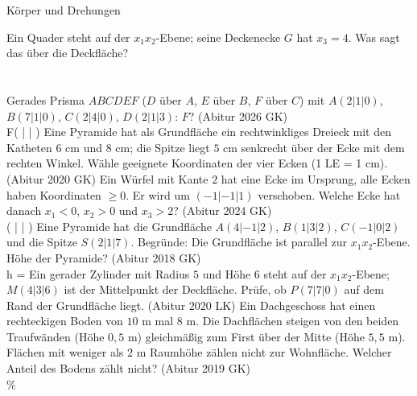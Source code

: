 \setcounter{aufgabe}{18}

\begin{aufgabe}{Körper und Drehungen}
\begin{teile}
\teil Ein Quader steht auf der $x_1x_2$-Ebene; seine Deckenecke $G$ hat $x_3 = 4$. Was sagt das über die Deckfläche? \\  \\  \\ 
\teil Gerades Prisma $ABCDEF$ ($D$ über $A$, $E$ über $B$, $F$ über $C$) mit $A(2 | 1 | 0)$, $B(7 | 1 | 0)$, $C(2 | 4 | 0)$, $D(2 | 1 | 3)$: $F$? \hfill (Abitur 2026 GK) \\ F( \leerfeld | \leerfeld | \leerfeld )
\teil Eine Pyramide hat als Grundfläche ein rechtwinkliges Dreieck mit den Katheten $6$ cm und $8$ cm; die Spitze liegt $5$ cm senkrecht über der Ecke mit dem rechten Winkel. Wähle geeignete Koordinaten der vier Ecken (1 LE = 1 cm). \hfill (Abitur 2020 GK)
\teil Ein Würfel mit Kante $2$ hat eine Ecke im Ursprung, alle Ecken haben Koordinaten $\ge 0$. Er wird um $(-1 | -1 | 1)$ verschoben. Welche Ecke hat danach $x_1 < 0$, $x_2 > 0$ und $x_3 > 2$? \hfill (Abitur 2024 GK) \\ ( \leerfeld | \leerfeld | \leerfeld )
\teil Eine Pyramide hat die Grundfläche $A(4 | -1 | 2)$, $B(1 | 3 | 2)$, $C(-1 | 0 | 2)$ und die Spitze $S(2 | 1 | 7)$. Begründe: Die Grundfläche ist parallel zur $x_1x_2$-Ebene. Höhe der Pyramide? \hfill (Abitur 2018 GK) \\ h = \leerfeld
\teil Ein gerader Zylinder mit Radius $5$ und Höhe $6$ steht auf der $x_1x_2$-Ebene; $M(4 | 3 | 6)$ ist der Mittelpunkt der Deckfläche. Prüfe, ob $P(7 | 7 | 0)$ auf dem Rand der Grundfläche liegt. \hfill (Abitur 2020 LK)
\teil Ein Dachgeschoss hat einen rechteckigen Boden von $10$ m mal $8$ m. Die Dachflächen steigen von den beiden Traufwänden (Höhe $0{,}5$ m) gleichmäßig zum First über der Mitte (Höhe $5{,}5$ m). Flächen mit weniger als $2$ m Raumhöhe zählen nicht zur Wohnfläche. Welcher Anteil des Bodens zählt nicht? \hfill (Abitur 2019 GK) \\ \leerfeld \%

\end{teile}
\end{aufgabe}

